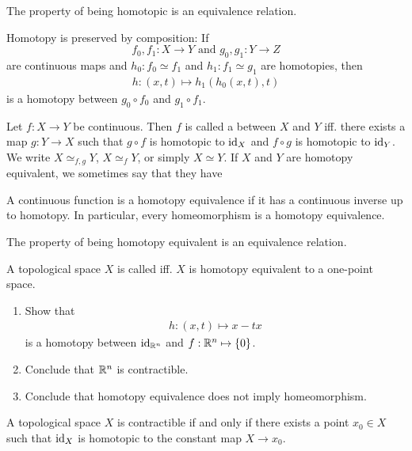 \begin{corollary}
	The property of being homotopic is an equivalence relation.
\end{corollary}
\begin{exercise}
	Homotopy is preserved by composition:
	If $$f_0, f_1 : X \to Y \text{  and  } g_0, g_1 : Y \to Z$$ are continuous maps and $h_0 : f_0 \simeq f_1$ and $h_1 : f_1 \simeq g_1$ are homotopies, then 
	\begin{align*}
		h : (x,t) \mapsto h_1(h_0(x,t),t)
	\end{align*}
	is a homotopy between $g_0 \circ f_0$ and $g_1 \circ f_1$.
\end{exercise}
\begin{importantdefinition}{}{}
	Let $f : X \to Y$ be continuous. Then $f$ is called a  between $X$ and $Y$ iff. there exists a map $g : Y \to X$ such that $g \circ f$ is homotopic to $\operatorname{id}_X$ and $f \circ g$ is homotopic to $\operatorname{id}_Y$. We write $X \simeq_{f,g} Y$, $X \simeq_f Y$, or simply $X \simeq Y$. If $X$ and $Y$ are homotopy equivalent, we sometimes say that they have 
\end{importantdefinition}
A continuous function is a homotopy equivalence if it has a continuous inverse up to homotopy. In particular, every homeomorphism is a homotopy equivalence.
\begin{corollary}
	The property of being homotopy equivalent is an equivalence relation.
\end{corollary}
\begin{definition}
	A topological space $X$ is called  iff. $X$ is homotopy equivalent to a one-point space.
\end{definition}
\begin{exercise}
	\begin{enumerate}
		\item Show that
		\begin{align*}
			h : (x,t) \mapsto x - tx
		\end{align*}
		is a homotopy between $\operatorname{id}_{\mathbb{R}^n}$ and $f : \mathbb{R}^n \mapsto \qty{0}$.
		\item Conclude that $\mathbb{R}^n$ is contractible.
		\item Conclude that homotopy equivalence does not imply homeomorphism.
	\end{enumerate}
\end{exercise}
\begin{exercise}
	A topological space $X$ is contractible if and only if there exists a point $x_0 \in X$ such that $\operatorname{id}_X$ is homotopic to the constant map $X \to {x_0}$.
\end{exercise}
